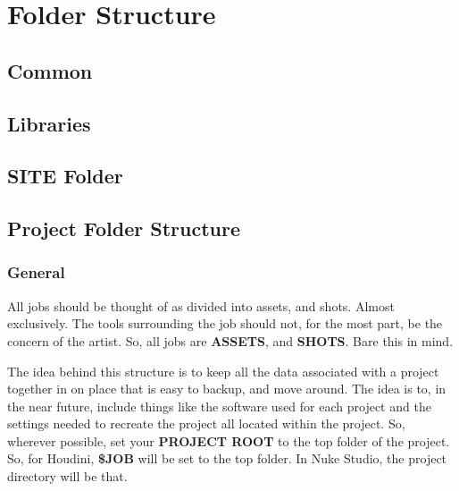 \section{Folder Structure}

\subsection{Common}

\subsection{Libraries}

\subsection{SITE Folder}

\subsection{Project Folder Structure}

\subsubsection{General}
All jobs should be thought of as divided into assets, and shots. Almost exclusively. The tools surrounding the job should not, for the most part, be the concern of the artist. So, all jobs are \textbf{ASSETS}, and \textbf{SHOTS}. Bare this in mind.

The idea behind this structure is to keep all the data associated with a project together in on place that is easy to backup, and move around. The idea is to, in the near future, include things like the software used for each project and the settings needed to recreate the project all located within the project. So, wherever possible, set your \textbf{PROJECT ROOT} to the top folder of the project. So, for Houdini, \textbf{\$JOB} will be set to the top folder. In Nuke Studio, the project directory will be that. 

